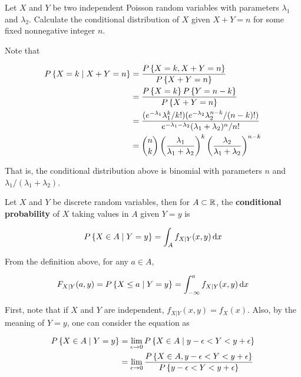 \documentclass[a4paper,12pt]{article}
\begin{document}
\begin{exm}
  Let $X$ and $Y$ be two independent Poisson random variables with parameters $\lambda_{1}$ and $\lambda_{2}$. Calculate the conditional distribution of $X$ given $X+Y=n$ for some fixed nonnegative integer $n$.\n

  \ans Note that

  $$\begin{aligned}[t]
    P\left\{ X=k\mid X+Y=n\right\}&=\frac{P\left\{ X=k,X+Y=n\right\}}{P\left\{ X+Y=n\right\}}\\
    &=\frac{P\left\{ X=k\right\}P\left\{ Y=n-k\right\}}{P\left\{ X+Y=n\right\}}\\
    &=\frac{(e^{-\lambda_{1}}\lambda_{1}^{k}/k!)(e^{-\lambda_{2}}\lambda_{2}^{n-k}/(n-k)!)}{e^{-\lambda_{1}-\lambda_{2}}(\lambda_{1}+\lambda_{2})^{n}/n!}\\
    &=\binom{n}{k}\left( \frac{\lambda_{1}}{\lambda_{1}+\lambda_{2}}\right)^{k}\left( \frac{\lambda_{2}}{\lambda_{1}+\lambda_{2}}\right)^{n-k}
  \end{aligned}$$\s

  That is, the conditional distribution above is binomial with parameters $n$ and $\lambda_{1}/(\lambda_{1}+\lambda_{2})$.
\end{exm}\n

\begin{dft}
  Let $X$ and $Y$ be discrete random variables, then for $A\subset\mathbb{R}$, the \textbf{conditional probability} of $X$ taking values in $A$ given $Y=y$ is

  $$P\left\{ X\in A\mid Y=y\right\}=\int_{A}f_{X|Y}(x,y)\,\mathrm{d} x$$
\end{dft}\n

From the definition above, for any $a\in A$,

$$F_{X|Y}(a,y)=P\left\{ X\leq a\mid Y=y\right\}=\int_{-\infty}^{a}f_{X|Y}(x,y)\,\mathrm{d} x$$\s

First, note that if $X$ and $Y$ are independent, $f_{X|Y}(x,y)=f_{X}(x)$. Also, by the meaning of $Y=y$, one can consider the equation as

$$\begin{aligned}[t]
  P\left\{ X\in A\mid Y=y\right\}&=\lim_{\epsilon\to 0}P\left\{ X\in A\mid y-\epsilon<Y<y+\epsilon\right\}\\
  &=\lim_{\epsilon\to 0}\frac{P\left\{ X\in A,y-\epsilon<Y<y+\epsilon\right\}}{P\left\{ y-\epsilon<Y<y+\epsilon\right\}}
\end{aligned}$$\s
\end{document}
